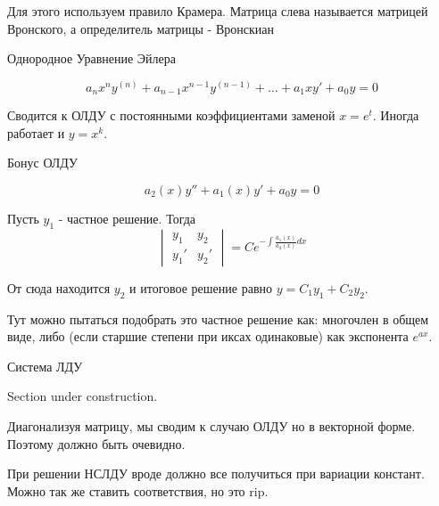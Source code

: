\documentclass[11pt]{article}
\begin{document}
\begin{enumerate}
\begin{itemize}
				Для этого используем правило Крамера. Матрица слева называется матрицей Вронского, а определитель матрицы - Вронскиан
			\end{itemize}
		
	\end{enumerate}

	\begin{center}
		Однородное Уравнение Эйлера
	\end{center}
	$$a_{n}x^n y^{(n)} +a_{n-1}x^{n-1} y^{(n-1)} + \dots + a_{1} xy' + a_{0} y = 0 $$
	
	Сводится к ОЛДУ с постоянными коэффициентами заменой $x = e^t$. Иногда работает и $y = x^k$.
	
	\begin{center}
		Бонус ОЛДУ
	\end{center}
	
	$$a_2(x) y'' + a_1(x)y' + a_0 y = 0$$
	
	Пусть $y_1$ - частное решение. Тогда
	$$
	\begin{vmatrix}
	y_1 & y_2\\
	y_1' & y_2'
	\end{vmatrix} = C e^{-\int \frac{a_1(x)}{a_2(x)}dx }
	$$
	
	От сюда находится $y_2$ и итоговое решение равно $y = C_1 y_1 + C_2 y_2$. 
	
	Тут можно пытаться подобрать это частное решение как: многочлен в общем виде, либо (если старшие степени при иксах одинаковые) как экспонента $e^{ax}$.
	\begin{center}
		Система ЛДУ
	\end{center}

	Section under construction.
	
	Диагонализуя матрицу, мы сводим к случаю ОЛДУ но в векторной форме. Поэтому должно быть очевидно.
	
	При решении НСЛДУ вроде должно все получиться при вариации констант. Можно так же ставить соответствия, но это rip.
	
	
\end{document}
